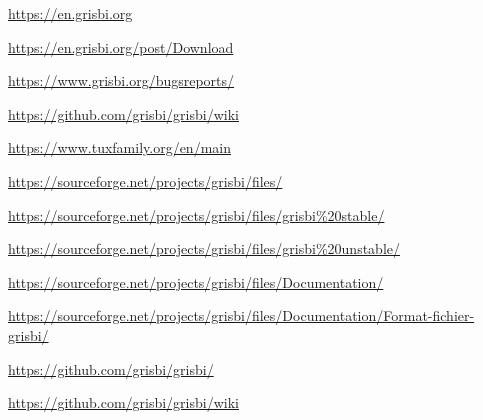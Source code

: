 

\urldef{\urlGrisbi}%
\url{https://en.grisbi.org}

\urldef{\urlGrisbiTelechargement}%
\url{https://en.grisbi.org/post/Download}

\urldef{\urlBugTracker}%
\url{https://www.grisbi.org/bugsreports/}

\urldef{\urlGrisbiWiki}%
\url{https://github.com/grisbi/grisbi/wiki}

\urldef{\urlTuxFamily}%
\url{https://www.tuxfamily.org/en/main}

\urldef{\urlSourceForge}%
\url{https://sourceforge.net/projects/grisbi/files/}

\urldef{\urlSourceForgeGrisbiStable}%
\url{https://sourceforge.net/projects/grisbi/files/grisbi\%20stable/}

\urldef{\urlSourceForgeGrisbiInstable}%
\url{https://sourceforge.net/projects/grisbi/files/grisbi\%20unstable/}

\urldef{\urlSourceForgeDocumentation}%
\url{https://sourceforge.net/projects/grisbi/files/Documentation/}

\urldef{\urlSourceForgeDocumentationFormat}%
\url{https://sourceforge.net/projects/grisbi/files/Documentation/Format-fichier-grisbi/}

\urldef{\urlGitHubGrisbi}%
\url{https://github.com/grisbi/grisbi/}

\urldef{\urlGitHubGrisbiWiki}
\url{https://github.com/grisbi/grisbi/wiki}

